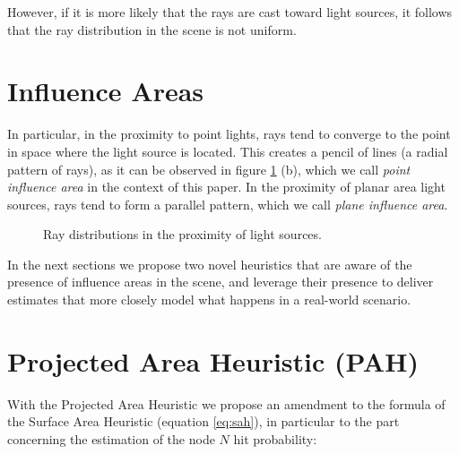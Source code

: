 \documentclass[acmtog, anonymous, review]{acmart}
\begin{document}
However, if it is more likely that the rays are cast toward light sources, it follows that the ray distribution in the scene is not uniform.

\section{Influence Areas} \label{sec:influence_areas}
In particular, in the proximity to point lights, rays tend to converge to the point in space where the light source is located. This creates a pencil of lines (a radial pattern of rays), as it can be observed in figure \ref{fig:ray_distributions} (b), which we call \textit{point influence area} in the context of this paper. In the proximity of planar area light sources, rays tend to form a parallel pattern, which we call \textit{plane influence area}.

\begin{figure}
  \quad
  \caption{Ray distributions in the proximity of light sources.}
  \label{fig:ray_distributions} 
\end{figure}

In the next sections we propose two novel heuristics that are aware of the presence of influence areas in the scene, and leverage their presence to deliver estimates that more closely model what happens in a real-world scenario.

\section{Projected Area Heuristic (PAH)} \label{sec:pah}
With the Projected Area Heuristic we propose an amendment to the formula of the Surface Area Heuristic (equation \ref{eq:sah}), in particular to the part concerning the estimation of the node $N$ hit probability:
\end{document}

